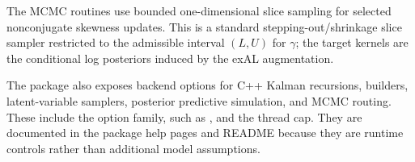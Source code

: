 \label{sec:slice}

The MCMC routines use bounded one-dimensional slice sampling for selected
nonconjugate skewness updates. This is a standard stepping-out/shrinkage
slice sampler restricted to the admissible interval $(L,U)$ for $\gamma$; the
target kernels are the conditional log posteriors induced by the exAL
augmentation.

\label{sec:app_backend_options}
The package also exposes backend options for C++ Kalman recursions, builders,
latent-variable samplers, posterior predictive simulation, and MCMC routing.
These include the  option family, such as
, and the  thread cap.
They are documented in the package help pages and README because they are
runtime controls rather than additional model assumptions.
